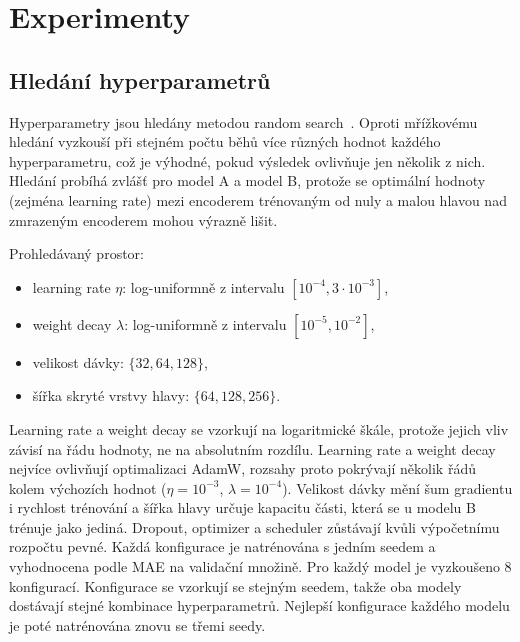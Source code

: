 \section{Experimenty}

\subsection*{Hledání hyperparametrů}

Hyperparametry jsou hledány metodou random search~\cite{bergstra2012random}. Oproti mřížkovému
hledání vyzkouší při stejném počtu běhů více různých hodnot každého hyperparametru, což je
výhodné, pokud výsledek ovlivňuje jen několik z nich. Hledání probíhá zvlášť pro model A a model B,
protože se optimální hodnoty (zejména learning rate) mezi encoderem trénovaným od nuly a malou
hlavou nad zmrazeným encoderem mohou výrazně lišit.

Prohledávaný prostor:
\begin{itemize}
    \item learning rate $\eta$: log-uniformně z intervalu $[10^{-4}, 3 \cdot 10^{-3}]$,
    \item weight decay $\lambda$: log-uniformně z intervalu $[10^{-5}, 10^{-2}]$,
    \item velikost dávky: $\{32, 64, 128\}$,
    \item šířka skryté vrstvy hlavy: $\{64, 128, 256\}$.
\end{itemize}
Learning rate a weight decay se vzorkují na logaritmické škále, protože jejich vliv závisí
na řádu hodnoty, ne na absolutním rozdílu. Learning rate a weight decay nejvíce ovlivňují
optimalizaci AdamW, rozsahy proto pokrývají několik řádů kolem výchozích hodnot ($\eta = 10^{-3}$,
$\lambda = 10^{-4}$). Velikost dávky mění šum gradientu i rychlost trénování a šířka hlavy určuje
kapacitu části, která se u modelu B trénuje jako jediná. Dropout, optimizer a scheduler zůstávají
kvůli výpočetnímu rozpočtu pevné. Každá konfigurace je natrénována s jedním seedem
a vyhodnocena podle MAE na validační množině. Pro každý model je vyzkoušeno 8 konfigurací.
Konfigurace se vzorkují se stejným seedem, takže oba modely dostávají stejné kombinace
hyperparametrů. Nejlepší konfigurace každého modelu je poté natrénována znovu se třemi seedy.


